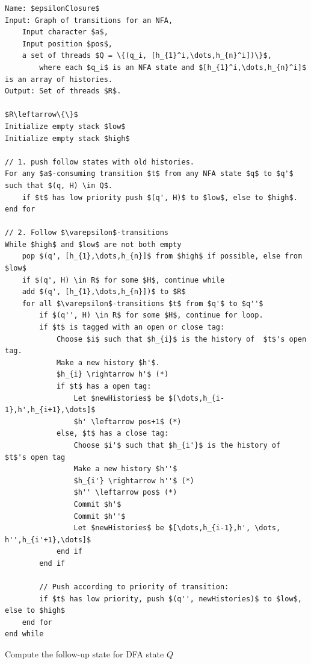 \documentclass[english]{sigplanconf}
\theoremstyle{definition}
\begin{document}
\begin{algorithm*}[tb]
\begin{lstlisting}[mathescape,tabsize=2]
Name: $epsilonClosure$
Input: Graph of transitions for an NFA,
	Input character $a$,
	Input position $pos$,
	a set of threads $Q = \{(q_i, [h_{1}^i,\dots,h_{n}^i])\}$,
		where each $q_i$ is an NFA state and $[h_{1}^i,\dots,h_{n}^i]$ is an array of histories.
Output: Set of threads $R$.

$R\leftarrow\{\}$
Initialize empty stack $low$
Initialize empty stack $high$

// 1. push follow states with old histories.
For any $a$-consuming transition $t$ from any NFA state $q$ to $q'$ such that $(q, H) \in Q$.
	if $t$ has low priority push $(q', H)$ to $low$, else to $high$.
end for

// 2. Follow $\varepsilon$-transitions
While $high$ and $low$ are not both empty
	pop $(q', [h_{1},\dots,h_{n}]$ from $high$ if possible, else from $low$
	if $(q', H) \in R$ for some $H$, continue while
	add $(q', [h_{1},\dots,h_{n}])$ to $R$
	for all $\varepsilon$-transitions $t$ from $q'$ to $q''$
		if $(q'', H) \in R$ for some $H$, continue for loop.
		if $t$ is tagged with an open or close tag:
			Choose $i$ such that $h_{i}$ is the history of  $t$'s open tag.
			Make a new history $h'$.
			$h_{i} \rightarrow h'$ (*)
			if $t$ has a open tag:
				Let $newHistories$ be $[\dots,h_{i-1},h',h_{i+1},\dots]$
				$h' \leftarrow pos+1$ (*)
			else, $t$ has a close tag:
				Choose $i'$ such that $h_{i'}$ is the history of  $t$'s open tag
				Make a new history $h''$
				$h_{i'} \rightarrow h''$ (*)
				$h'' \leftarrow pos$ (*)
				Commit $h'$
				Commit $h''$
				Let $newHistories$ be $[\dots,h_{i-1},h', \dots, h'',h_{i'+1},\dots]$
			end if
		end if				
				
		// Push according to priority of transition:
		if $t$ has low priority, push $(q'', newHistories)$ to $low$, else to $high$
	end for
end while
\end{lstlisting}
\label{alg:epsilonClosure}
\caption{Compute the follow-up state for DFA state $Q$}
\end{algorithm*}
\end{document}
